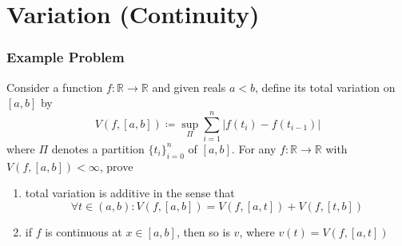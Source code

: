 \documentclass[10pt,letterpaper]{article} %
\begin{document}

\pagebreak
\section{Variation (Continuity)}
\subsubsection{Example Problem}
Consider a function $f: \mathbb{R} \xrightarrow{} \mathbb{R}$ and given reals $a < b$, define its total variation on $[a, b]$ by
\begin{equation*}
V(f, [a, b]) \coloneq \sup_{\Pi}\sum_{i=1}^{n}|f(t_i) - f(t_{i-1})|
\end{equation*}
where $\Pi$ denotes a partition $\{t_i\}_{i =0}^{n}$ of $[a, b]$. For any $f: \mathbb{R} \xrightarrow{} \mathbb{R}$ with $V(f, [a, b]) < \infty$, prove
\begin{enumerate}
\item total variation is additive in the sense that
\begin{equation*}
\forall t \in (a, b): V(f, [a, b]) = V(f, [a, t]) + V(f, [t, b])
\end{equation*}
\item if $f$ is continuous at $x \in [a, b]$, then so is $v$, where $v(t) = V(f, [a, t])$
\end{enumerate}
\end{document}

